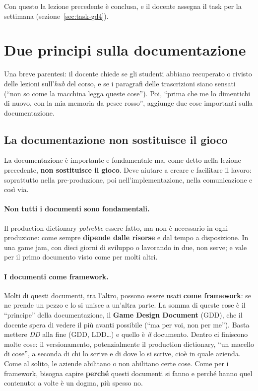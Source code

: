 Con questo la lezione precedente è conclusa, e il docente assegna il task per
la settimana (sezione~\ref{sec:task-gd4}).

\section{Due principi sulla documentazione}
\label{sec:due-principi}

Una breve parentesi: il docente chiede se gli studenti abbiano recuperato o
rivisto delle lezioni sull'\emph{hub} del corso, e se i paragrafi delle
trascrizioni siano sensati (``non so come la macchina legga queste cose'').
Poi, ``prima che me lo dimentichi di nuovo, con la mia memoria da pesce
rosso'', aggiunge due cose importanti sulla documentazione.

\subsection{La documentazione non sostituisce il gioco}

La documentazione è importante e fondamentale ma, come detto nella lezione
precedente, \textbf{non sostituisce il gioco}. Deve aiutare a creare e
facilitare il lavoro: soprattutto nella pre-produzione, poi
nell'implementazione, nella comunicazione e così via.

\paragraph{Non tutti i documenti sono fondamentali.} Il production dictionary
\emph{potrebbe} essere fatto, ma non è necessario in ogni produzione: come
sempre \textbf{dipende dalle risorse} e dal tempo a disposizione. In una game
jam, con dieci giorni di sviluppo o lavorando in due, non serve; e vale per il
primo documento visto come per molti altri.

\paragraph{I documenti come framework.} Molti di questi documenti, tra
l'altro, possono essere usati \textbf{come framework}: se ne prende un pezzo e
lo si unisce a un'altra parte. La somma di queste cose è il ``principe'' della
documentazione, il \textbf{Game Design Document} (GDD), che il docente spera
di vedere il più avanti possibile (``ma per voi, non per me''). Basta mettere
\emph{DD} alla fine (GDD, LDD\dots) e quello è \emph{il} documento. Dentro ci
finiscono molte cose: il versionamento, potenzialmente il production
dictionary, ``un macello di cose'', a seconda di chi lo scrive e di dove lo si
scrive, cioè in quale azienda. Come al solito, le aziende abilitano o non
abilitano certe cose. Come per i framework, bisogna capire \textbf{perché}
questi documenti si fanno e perché hanno quel contenuto: a volte è un dogma,
più spesso no.


